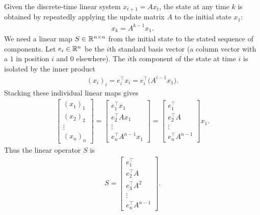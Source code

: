 \documentclass[a4paper, 11pt]{article}
\begin{document}
\begin{solution}
Given the discrete-time linear system $x_{t+1}=Ax_t$, the state at any time $k$ is obtained by repeatedly applying the update matrix $A$ to the initial state $x_1$:
\begin{align*}
    x_k = A^{k-1}x_1.
\end{align*}
We need a linear map $S\in\mathbb{R}^{n\times n}$ from the initial state to the stated sequence of components. Let $e_i\in\mathbb{R}^n$ be the $i$th standard basis vector (a column vector with a $1$ in position $i$ and $0$ elsewhere). The $i$th component of the state at time $i$ is isolated by the inner product
\begin{align*}
    (x_i)_i = e_i^\top x_i = e_i^\top\big(A^{i-1}x_1\big).
\end{align*}
Stacking these individual linear maps gives
\begin{align*}
    \begin{bmatrix} (x_1)_1\\ (x_2)_2\\ \vdots\\ (x_n)_n \end{bmatrix}
    = \begin{bmatrix} e_1^\top x_1\\ e_2^\top A x_1\\ \vdots\\ e_n^\top A^{n-1}x_1 \end{bmatrix}
    = \begin{bmatrix} e_1^\top\\ e_2^\top A\\ \vdots\\ e_n^\top A^{n-1} \end{bmatrix} x_1.
\end{align*}
Thus the linear operator $S$ is
\begin{align*}
    S = \begin{bmatrix} e_1^\top\\ e_2^\top A\\ e_3^\top A^2\\ \vdots\\ e_n^\top A^{n-1} \end{bmatrix}.
\end{align*}
\end{solution}
\problemend
\end{document}
